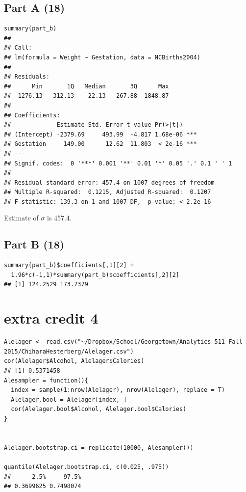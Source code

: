 \documentclass{article}\usepackage[]{graphicx}\usepackage[]{color}
\makeatletter
\newenvironment{kframe}{%
 \def\at@end@of@kframe{}%
 \ifinner\ifhmode%
  \def\at@end@of@kframe{\end{minipage}}%
  \begin{minipage}{\columnwidth}%
 \fi\fi%
 \def\FrameCommand##1{\hskip\@totalleftmargin \hskip-\fboxsep
 \colorbox{shadecolor}{##1}\hskip-\fboxsep
     \hskip-\linewidth \hskip-\@totalleftmargin \hskip\columnwidth}%
 \MakeFramed {\advance\hsize-\width
   \@totalleftmargin\z@ \linewidth\hsize
   \@setminipage}}%
 {\par\unskip\endMakeFramed%
 \at@end@of@kframe}
\newenvironment{knitrout}{}{} %
\makeatother
\begin{document}
\subsection*{Part A (18)}
\begin{knitrout}
\color{fgcolor}\begin{kframe}
\begin{verbatim}
summary(part_b)
## 
## Call:
## lm(formula = Weight ~ Gestation, data = NCBirths2004)
## 
## Residuals:
##      Min       1Q   Median       3Q      Max 
## -1276.13  -312.13   -22.13   267.88  1848.87 
## 
## Coefficients:
##             Estimate Std. Error t value Pr(>|t|)    
## (Intercept) -2379.69     493.99  -4.817 1.68e-06 ***
## Gestation     149.00      12.62  11.803  < 2e-16 ***
## ---
## Signif. codes:  0 '***' 0.001 '**' 0.01 '*' 0.05 '.' 0.1 ' ' 1
## 
## Residual standard error: 457.4 on 1007 degrees of freedom
## Multiple R-squared:  0.1215,	Adjusted R-squared:  0.1207 
## F-statistic: 139.3 on 1 and 1007 DF,  p-value: < 2.2e-16
\end{verbatim}
\end{kframe}
\end{knitrout}
Estimate of $\sigma$ is 457.4.
\subsection*{Part B (18)}
\begin{knitrout}
\color{fgcolor}\begin{kframe}
\begin{verbatim}
summary(part_b)$coefficients[,1][2] +
  1.96*c(-1,1)*summary(part_b)$coefficients[,2][2]
## [1] 124.2529 173.7379
\end{verbatim}
\end{kframe}
\end{knitrout}

\section*{extra credit 4}
\begin{knitrout}
\color{fgcolor}\begin{kframe}
\begin{verbatim}
Alelager <- read.csv("~/Dropbox/School/Georgetown/Analytics 511 Fall 2015/ChiharaHesterberg/Alelager.csv")
cor(Alelager$Alcohol, Alelager$Calories)
## [1] 0.5371458
Alesampler = function(){
  index = sample(1:nrow(Alelager), nrow(Alelager), replace = T)
  Alelager.bool = Alelager[index, ]
  cor(Alelager.bool$Alcohol, Alelager.bool$Calories)
}


Alelager.bootstrap.ci = replicate(10000, Alesampler())
                        
quantile(Alelager.bootstrap.ci, c(0.025, .975))
##      2.5%     97.5% 
## 0.3699625 0.7498074
\end{verbatim}
\end{kframe}
\end{knitrout}
\end{document}
